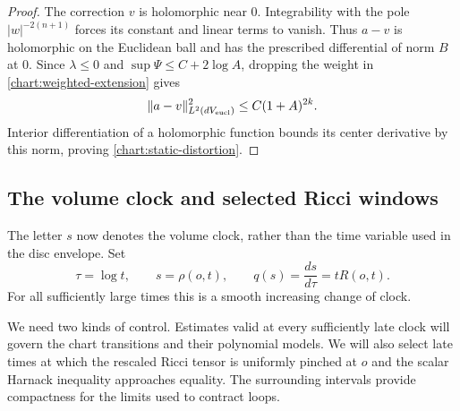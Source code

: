 \begin{proof}
The correction $v$ is holomorphic near $0$.  Integrability with
the pole $|w|^{-2(n+1)}$ forces its constant and linear terms
to vanish.  Thus $a-v$ is holomorphic on the Euclidean ball
and has the prescribed differential of norm $B$ at $0$.
Since $\lambda\le0$ and
$\sup\Psi\le C+2\log A$, dropping the weight in
\eqref{chart:weighted-extension} gives
\[
 \|a-v\|_{L^2(dV_{\rm eucl})}^2\le C(1+A)^{2k}.
\]
Interior differentiation of a holomorphic function bounds its
center derivative by this norm, proving
\eqref{chart:static-distortion}.
\end{proof}

\subsection{The volume clock and selected Ricci windows}

The letter $s$ now denotes the volume clock, rather than the time
variable used in the disc envelope.  Set
\begin{equation}\label{chart:clocks}
 \tau=\log t,\qquad s=\rho(o,t),\qquad
 q(s)=\frac{ds}{d\tau}=tR(o,t).
\end{equation}
For all sufficiently large times this is a smooth increasing change
of clock.

We need two kinds of control.  Estimates valid at every sufficiently
late clock will govern the chart transitions and their polynomial
models.  We will also select late times at which the rescaled Ricci
tensor is uniformly pinched at $o$ and the scalar Harnack inequality
approaches equality.  The surrounding intervals provide compactness
for the limits used to contract loops.

